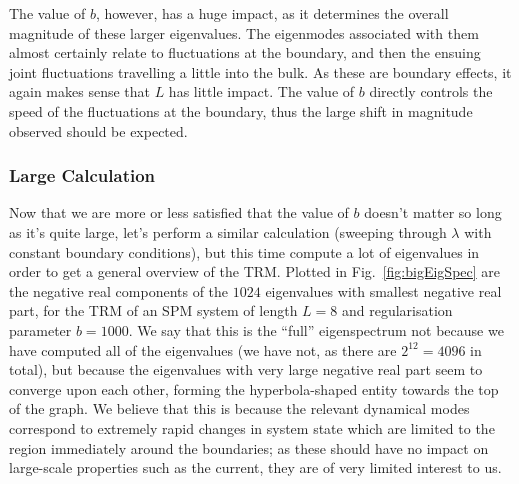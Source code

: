 The value of $b$, however, has a huge impact, as it determines the overall magnitude
of these larger eigenvalues. The eigenmodes associated with them almost certainly
relate to fluctuations at the boundary, and then the ensuing joint fluctuations 
travelling a little into the bulk. As these are boundary effects, it again makes sense
that $L$ has little impact. The value of $b$ directly controls the speed of the 
fluctuations at the boundary, thus the large shift in magnitude observed should be 
expected.

\subsubsection{Large Calculation}
Now that we are more or less satisfied that the value of $b$ doesn't matter so long as
it's quite large, let's perform a similar calculation (sweeping through $\lambda$ with
constant boundary conditions), but this time compute a lot of eigenvalues in order to
get a general overview of the TRM. 
Plotted in Fig.~\ref{fig:bigEigSpec} are the negative real components of the $1024$ eigenvalues with smallest negative
 real part, for the TRM of an SPM system of length $L=8$ and regularisation parameter 
 $b=1000$. We say that this is the ``full'' eigenspectrum not because
 we have computed all of the eigenvalues (we have not, as there are $2^{12} = 4096$ in
 total), but because the eigenvalues with very large negative real part seem to converge
 upon each other, forming the hyperbola-shaped entity towards the top of the graph.
 We believe that this is because the relevant dynamical modes correspond to extremely rapid changes in system state which are limited to the region immediately around the boundaries; as these should
 have no impact on large-scale properties such as the current, they are of very limited
 interest
 to us.
 
